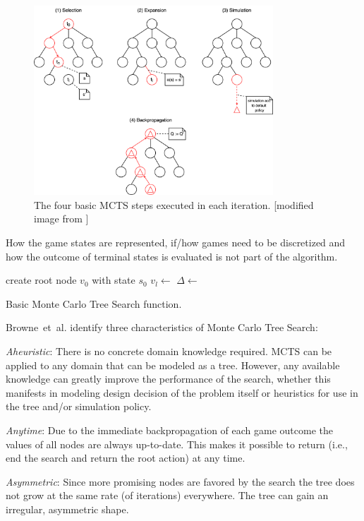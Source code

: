 \begin{figure}[ht]
    \centering
    \includegraphics[width=0.8\textwidth]{img/mcts-basics.png}
    \caption{The four basic MCTS steps executed in each iteration. [modified image from \cite{browne2012survey}]}
    \label{fig:mcts_basics}
\end{figure}
How the game states are represented, if/how games need to be discretized and how the outcome of terminal states is evaluated is not part of the algorithm. 
\begin{algorithm}[ht!]
\begin{algorithmic}
    \State create root node $v_0$ with state $s_0$
    \State $v_l \gets$  
    \State $\Delta \gets$  
    \State {}
    \EndWhile
    \State \Return {} 
\EndFunction
\end{algorithmic}
\caption{Basic Monte Carlo Tree Search function.}
\label{alg:mcts_basic}
\end{algorithm}

Browne~et~al. \cite{browne2012survey} identify three characteristics of Monte Carlo Tree Search: \begin{enumerate*}[label=\alph*)]
    \item \textit{Aheuristic}: There is no concrete domain knowledge required. MCTS can be applied to any domain that can be modeled as a tree. However, any available knowledge can greatly improve the performance of the search, whether this manifests in modeling design decision of the problem itself or heuristics for use in the tree and/or simulation policy.   
    \item \textit{Anytime}: Due to the immediate backpropagation of each game outcome the values of all nodes are always up-to-date. This makes it possible to return (i.e., end the search and return the root action) at any time.
    \item \textit{Asymmetric}: Since more promising nodes are favored by the search the tree does not grow at the same rate (of iterations) everywhere. The tree can gain an irregular, asymmetric shape.
\end{enumerate*}
